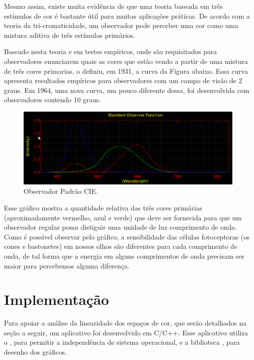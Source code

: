 \documentclass[a4paper,10pt]{report}
\begin{document}
\par
Mesmo assim, existe muita evidência de que uma teoria baseada em três estímulos
de cor é bastante útil para muitas aplicações práticas. De acordo com a teoria
da tri-cromaticidade, um observador pode perceber uma cor como uma mistura
aditiva de três estímulos primários.

\par
Baseado nesta teoria e em testes empíricos, onde são requisitados para
observadores enunciarem quais as cores que estão vendo a partir de uma mistura
de três cores primarias, o  definiu, em 1931,
a curva da Figura abaixo. Essa curva apresenta resultados empíricos para
observadores com um campo de visão de 2 graus. Em 1964, uma nova curva, um
pouco diferente dessa, foi desenvolvida com observadores contendo 10 graus.

\begin{figure}[!htb]
     \centering
     \includegraphics[scale=0.8]{img/cie_std_observer.png}
     \caption{Observador Padrão CIE.}
     \label{fig:standard_observer}
\end{figure}

\par
Esse gráfico mostra a quantidade relativa das três cores primárias
(aproximadamente vermelho, azul e verde) que deve ser fornecida para que um
observador regular possa distiguir uma unidade de luz comprimento de onda. Como
é possível observar pelo gráfico, a sensibilidade das células fotoceptoras
(os cones e bastonetes) em nossos olhos são diferentes para cada comprimento de
onda, de tal forma que a energia em alguns comprimentos de onda precisam ser
maior para percebemos alguma diferença.

\section{Implementação}
Para apoiar a análise da linearidade dos espaços de cor, que serão detalhados
na seção a seguir, um aplicativo foi desenvolvido em C/C++. Esse aplicativo
utiliza o , para permitir a
independência de
sistema operacional, e a biblioteca
, para desenho dos
gráficos.
\end{document}

